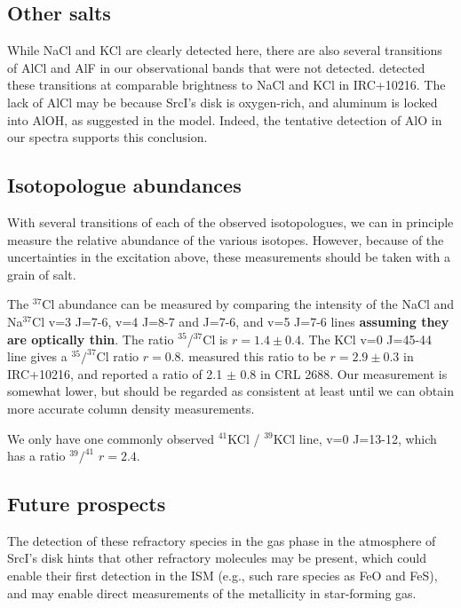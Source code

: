 \documentclass[twocolumn]{aastex62}
\newcommand{\sourcei}{SrcI\xspace}
\newcommand{\rlp}[1]{\textcolor{red!65!black}{\textbf{[RLP: #1]}}}
\newcommand{\ag}[1]{\textcolor{red!65!black}{\textbf{[AG: #1]}}}
\newcommand{\referee}[1]{\textbf{#1}}
\begin{document}
\subsection{Other salts}
While NaCl and KCl are clearly detected here, there are also several
transitions of AlCl and AlF in our observational bands that were not detected.
\citet{Cernicharo1987a} detected these transitions at comparable brightness to
NaCl and KCl in IRC+10216.  The lack of AlCl may be because \sourcei's disk is
oxygen-rich, and aluminum is locked into AlOH, as suggested in the
\citet{Cherchneff2012a} model.  Indeed, the tentative detection of AlO
in our spectra supports this conclusion.



\subsection{Isotopologue abundances}
With several transitions of each of the observed isotopologues, we can in
principle measure the relative abundance of the various isotopes.  However,
because of the uncertainties in the excitation above, these measurements should
be taken with a grain of salt.

The $^{37}$Cl abundance can be measured by comparing the intensity of the NaCl
and Na$^{37}$Cl v=3 J=7-6, v=4 J=8-7 and J=7-6, and v=5 J=7-6 lines
\referee{assuming they are optically thin}.  The ratio $^{35}$/$^{37}$Cl is
$r=1.4\pm0.4$.  The KCl v=0 J=45-44 line gives a $^{35}/^{37}$Cl ratio $r=0.8$.
\citet{Agundez2012a} measured this ratio to be $r=2.9\pm0.3$ in IRC+10216, and
\citet{Highberger2003a} reported a ratio of 2.1 $\pm$ 0.8 in CRL 2688.  Our
measurement is somewhat lower, but should be regarded as consistent at least
until we can obtain more accurate column density measurements. 


We only have one commonly observed $^{41}$KCl / $^{39}$KCl line, v=0 J=13-12,
which has a ratio $^{39}/^{41}$ $r=2.4$. 


\subsection{Future prospects}
The detection of these refractory species in the gas phase in the atmosphere
of \sourcei's disk hints that other refractory molecules may be present, 
which could enable their first detection in the ISM (e.g., such rare species as
FeO and FeS), and may enable direct measurements of the metallicity in
star-forming gas.
\end{document}
